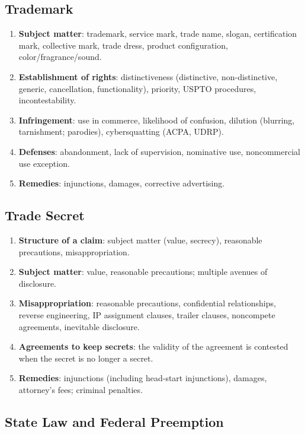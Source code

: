 \subsection{Trademark}

\begin{enumerate}
    \item \textbf{Subject matter}: trademark, service mark, trade name, 
    slogan, certification mark, collective mark, trade dress, product 
    configuration, color/fragrance/sound.
    \item \textbf{Establishment of rights}: distinctiveness (distinctive, 
    non-distinctive, generic, cancellation, functionality), priority, USPTO 
    procedures, incontestability.
    \item \textbf{Infringement}: use in commerce, likelihood of confusion, 
    dilution (blurring, tarnishment; parodies), cybersquatting (ACPA, UDRP).
    \item \textbf{Defenses}: abandonment, lack of supervision, nominative use, 
    noncommercial use exception.
    \item \textbf{Remedies}: injunctions, damages, corrective advertising.
\end{enumerate}

\subsection{Trade Secret}

\begin{enumerate}
    \item \textbf{Structure of a claim}: subject matter (value, secrecy), 
    reasonable precautions, misappropriation.
    \item \textbf{Subject matter}: value, reasonable precautions; multiple 
    avenues of disclosure.
    \item \textbf{Misappropriation}: reasonable precautions, confidential 
    relationships, reverse engineering, IP assignment clauses, trailer 
    clauses, noncompete agreements, inevitable disclosure.
    \item \textbf{Agreements to keep secrets}: the validity of the agreement 
    is contested when the secret is no longer a secret.
    \item \textbf{Remedies}: injunctions (including head-start injunctions), 
    damages, attorney's fees; criminal penalties.
\end{enumerate}

\subsection{State Law and Federal Preemption}

